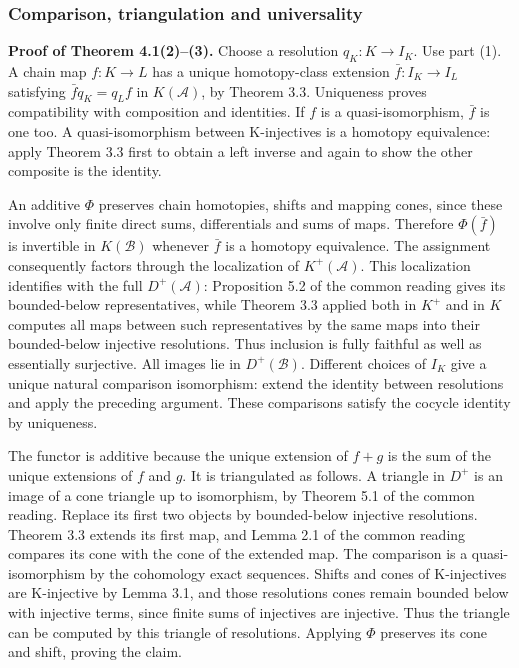 \documentclass[
  english,
  11pt,
  a4paper,
]{article}
\begin{document}
\subsubsection{Comparison, triangulation and
universality}\label{injective-modules-and-bounded-below-derived-functors--comparison-triangulation-and-universality}

\textbf{Proof of Theorem 4.1(2)--(3).} Choose a resolution
\(q_K:K\to I_K\). Use part (1). A chain map \(f:K\to L\) has a unique
homotopy-class extension \(\bar f:I_K\to I_L\) satisfying
\(\bar f q_K=q_L f\) in \(K(\mathcal A)\), by Theorem 3.3. Uniqueness
proves compatibility with composition and identities. If \(f\) is a
quasi-isomorphism, \(\bar f\) is one too. A quasi-isomorphism between
K-injectives is a homotopy equivalence: apply Theorem 3.3 first to
obtain a left inverse and again to show the other composite is the
identity.

An additive \(\Phi\) preserves chain homotopies, shifts and mapping
cones, since these involve only finite direct sums, differentials and
sums of maps. Therefore \(\Phi(\bar f)\) is invertible in
\(K(\mathcal B)\) whenever \(\bar f\) is a homotopy equivalence. The
assignment consequently factors through the localization of
\(K^+(\mathcal A)\). This localization identifies with the full
\(D^+(\mathcal A)\): Proposition 5.2 of the common reading gives its
bounded-below representatives, while Theorem 3.3 applied both in \(K^+\)
and in \(K\) computes all maps between such representatives by the same
maps into their bounded-below injective resolutions. Thus inclusion is
fully faithful as well as essentially surjective. All images lie in
\(D^+(\mathcal B)\). Different choices of \(I_K\) give a unique natural
comparison isomorphism: extend the identity between resolutions and
apply the preceding argument. These comparisons satisfy the cocycle
identity by uniqueness.

The functor is additive because the unique extension of \(f+g\) is the
sum of the unique extensions of \(f\) and \(g\). It is triangulated as
follows. A triangle in \(D^+\) is an image of a cone triangle up to
isomorphism, by Theorem 5.1 of the common reading. Replace its first two
objects by bounded-below injective resolutions. Theorem 3.3 extends its
first map, and Lemma 2.1 of the common reading compares its cone with
the cone of the extended map. The comparison is a quasi-isomorphism by
the cohomology exact sequences. Shifts and cones of K-injectives are
K-injective by Lemma 3.1, and those resolutions\textquotesingle{} cones
remain bounded below with injective terms, since finite sums of
injectives are injective. Thus the triangle can be computed by this
triangle of resolutions. Applying \(\Phi\) preserves its cone and shift,
proving the claim.
\end{document}
